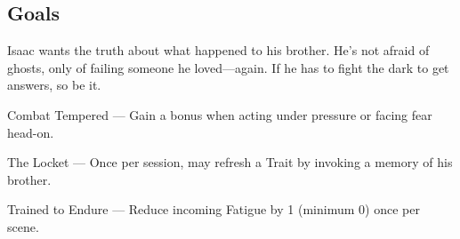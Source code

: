 \documentclass[nodeprecatedcode,bg=print]{dndbook/dndbook}
\begin{document}
\begin{WyrdCharacterSheet}
    \subsection{Goals}
    Isaac wants the truth about what happened to his brother. He’s not afraid of ghosts, only of failing someone he loved—again. If he has to fight the dark to get answers, so be it.
  
    \begin{WyrdStatsBlock}[profile=img/characters/isaac_bellamy]
        \SkillsBox[%
            expert={Discipline},%
            skilled={Athletics, Fight},%
            novice={Awareness, Insight, Will},%
        ]
  
        \begin{TraitsBox}
            \item[Combat Tempered] — Gain a bonus when acting under pressure or facing fear head-on.
            \item[The Locket] — Once per session, may refresh a Trait by invoking a memory of his brother.
            \item[Trained to Endure] — Reduce incoming Fatigue by 1 (minimum 0) once per scene.
        \end{TraitsBox}
  
        \DamageBox[%
        ]
    \end{WyrdStatsBlock}
\end{WyrdCharacterSheet}
  
\end{document}
